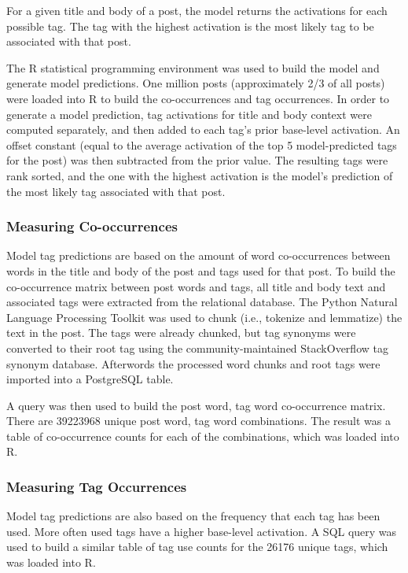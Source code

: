 \documentclass[10pt,letterpaper]{article}
\begin{document}
For a given title and body of a post, the model returns the activations for each possible tag.
The tag with the highest activation is the most likely tag to be associated with that post.

The R statistical programming environment was used to build the model and generate model predictions.
One million posts (approximately 2/3 of all posts) were loaded into R to build the co-occurrences and tag occurrences.
In order to generate a model prediction, tag activations for title and body context were computed separately, and then added to each tag's prior base-level activation.
An offset constant (equal to the average activation of the top 5 model-predicted tags for the post) was then subtracted from the prior value.
The resulting tags were rank sorted, and the one with the highest activation is the model's prediction of the most likely tag associated with that post.

\subsubsection{Measuring Co-occurrences}

Model tag predictions are based on the amount of word co-occurrences between words in the title and body of the post and tags used for that post.
To build the co-occurrence matrix between post words and tags, all title and body text and associated tags were extracted from the relational database.
The Python Natural Language Processing Toolkit \cite{Bird2009} was used to chunk (i.e., tokenize and lemmatize) the text in the post.
The tags were already chunked, but tag synonyms were converted to their root tag using the community-maintained StackOverflow tag synonym database.
Afterwords the processed word chunks and root tags were imported into a PostgreSQL table.

A query was then used to build the post word, tag word co-occurrence matrix.
There are \num{39223968} unique post word, tag word combinations.
The result was a table of co-occurrence counts for each of the combinations, which was loaded into R.

\subsubsection{Measuring Tag Occurrences}

Model tag predictions are also based on the frequency that each tag has been used.
More often used tags have a higher base-level activation.
A SQL query was used to build a similar table of tag use counts for the \num{26176} unique tags, which was loaded into R.
\end{document}
